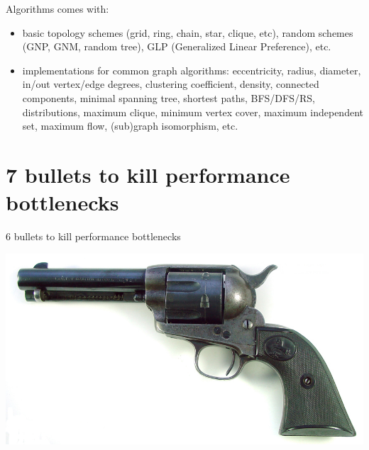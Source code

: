 \documentclass{beamer}
\newcommand{\sectionti}[1]{{\Huge #1}}
\begin{document}
\begin{frame}{Algorithms}
\grph comes with:
\begin{itemize}
\item \alert{basic topology schemes} (grid, ring, chain, star, clique, etc), random schemes (GNP, GNM, random tree), GLP (Generalized Linear Preference), etc.
\item \alert{implementations for common graph algorithms}: 
eccentricity, radius, diameter, in/out vertex/edge degrees, clustering coefficient, density, connected components, minimal spanning tree, shortest paths, BFS/DFS/RS, distributions, maximum clique, minimum vertex cover, maximum independent set, maximum flow, (sub)graph isomorphism, etc.

\end{itemize}
\end{frame}






\section{7 bullets to kill  performance bottlenecks}
\begin{frame}
\sectionti{6 bullets to kill  performance bottlenecks}
\begin{flushright}
\includegraphics[width=0.5\linewidth]{gun.jpg}
\end{flushright}

\end{frame}
\end{document}
